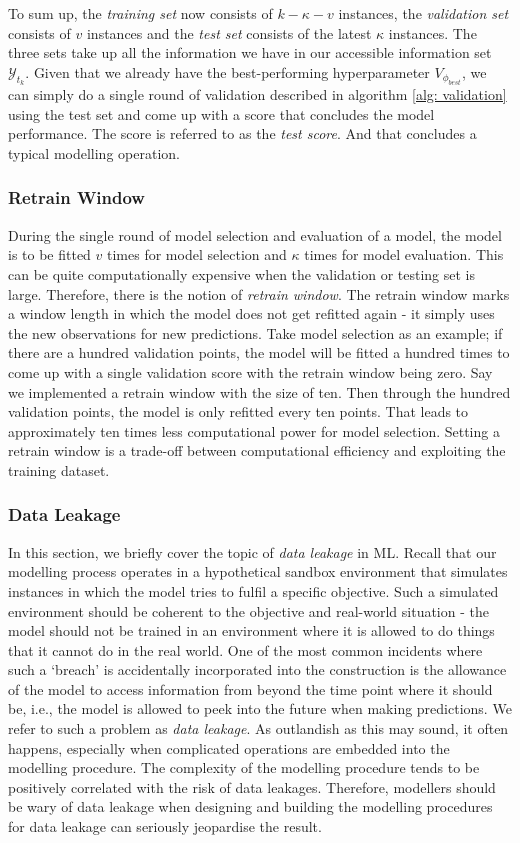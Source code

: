 To sum up, the \textit{training set} now consists of $k - \kappa - v$ instances, the \textit{validation set} consists of $v$ instances and the \textit{test set} consists of the latest $\kappa$ instances. The three sets take up all the information we have in our accessible information set $\mathcal{Y}_{t_k}$. Given that we already have the best-performing hyperparameter $V_{\phi_{best}}$, we can simply do a single round of validation described in algorithm \ref{alg: validation} using the test set and come up with a score that concludes the model performance. The score is referred to as the \textit{test score}. And that concludes a typical modelling operation.

\subsubsection{Retrain Window}
During the single round of model selection and evaluation of a model, the model is to be fitted $v$ times for model selection and $\kappa$ times for model evaluation. This can be quite computationally expensive when the validation or testing set is large. Therefore, there is the notion of \textit{retrain window}. The retrain window marks a window length in which the model does not get refitted again - it simply uses the new observations for new predictions. Take model selection as an example; if there are a hundred validation points, the model will be fitted a hundred times to come up with a single validation score with the retrain window being zero. Say we implemented a retrain window with the size of ten. Then through the hundred validation points, the model is only refitted every ten points. That leads to approximately ten times less computational power for model selection. Setting a retrain window is a trade-off between computational efficiency and exploiting the training dataset.

\subsubsection{Data Leakage}\label{subsubsec: data leakage}
In this section, we briefly cover the topic of \textit{data leakage} in ML. Recall that our modelling process operates in a hypothetical sandbox environment that simulates instances in which the model tries to fulfil a specific objective. Such a simulated environment should be coherent to the objective and real-world situation - the model should not be trained in an environment where it is allowed to do things that it cannot do in the real world. One of the most common incidents where such a `breach' is accidentally incorporated into the construction is the allowance of the model to access information from beyond the time point where it should be, i.e., the model is allowed to peek into the future when making predictions. We refer to such a problem as \textit{data leakage}. As outlandish as this may sound, it often happens, especially when complicated operations are embedded into the modelling procedure. The complexity of the modelling procedure tends to be positively correlated with the risk of data leakages. Therefore, modellers should be wary of data leakage when designing and building the modelling procedures for data leakage can seriously jeopardise the result.
